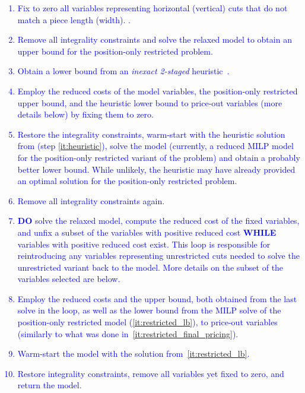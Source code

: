 \documentclass[ppgc,tese,english,formais,babel]{iiufrgs}
\newif\iffinalversion
\newcommand{\newtext}[1]{\iffinalversion%
#1%
\else%
\textcolor{blue}{#1}%
\fi%
}
\begin{document}
\newtext{
\begin{enumerate}
\item Fix to zero all variables representing \newtext{horizontal (vertical)} cuts \newtext{that do not match a piece length (width).}.
\item Remove all integrality constraints and solve the relaxed model to obtain an upper bound for the \newtext{position-only} restricted problem.
\item Obtain a lower bound from an \emph{inexact 2-staged} heuristic~\citep{furini:2016,dolatabadi:2012}.\label{it:heuristic}
\item Employ the reduced costs of the model variables, the \newtext{position-only} restricted upper bound, and the heuristic lower bound to price-out variables (more details below) by fixing them to zero.\label{it:restricted_final_pricing}
\item Restore the integrality constraints, warm-start with the heuristic solution from (step \autoref{it:heuristic}), solve the model (currently, a reduced MILP model for the \newtext{position-only} restricted variant of the problem) and obtain a probably better lower bound. While unlikely, the heuristic may have already provided an optimal solution for the \newtext{position-only} restricted problem.\label{it:restricted_lb}
\item Remove all integrality constraints again.
\item \textbf{DO} solve the relaxed model, compute the reduced cost of the fixed variables, and unfix a subset of the variables with positive reduced cost \textbf{WHILE} variables with positive reduced cost exist. This loop is responsible for reintroducing any variables representing unrestricted cuts needed to solve the unrestricted variant back to the model. More details on the subset of the variables selected are below.\label{it:loop}
\item Employ the reduced costs and the upper bound, both obtained from the last solve in the loop, as well as the lower bound from the MILP solve of the \newtext{position-only} restricted model (\autoref{it:restricted_lb}), to price-out variables (similarly to what was done in~\autoref{it:restricted_final_pricing}).\label{it:final_pricing}
\item Warm-start the model with the solution from~\autoref{it:restricted_lb}.
\item Restore integrality constraints, remove all variables yet fixed to zero, and return the model.
\end{enumerate}
}
\end{document}
